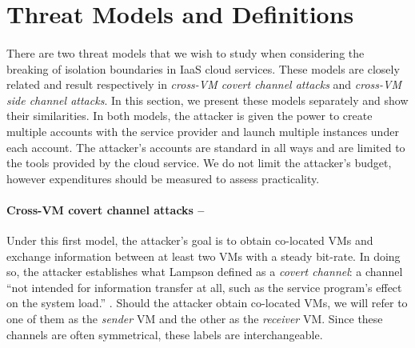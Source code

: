 \documentclass[orivec,envcountsame, a4paper, 11pt]{llncs}
\begin{document}
\section{Threat Models and Definitions}
\label{sec:threatmodel}

\begin{comment}
	- Threat model is realistic: Ristenpart 2009. Achieve random and targeted co-residence, establish communication channels
	- Show that model still held a few years later with Xu 2015 and Varadarajan 2015. Even though Amazon had changed their policy slightly
	- Lack of more recent study, could be "due" very soon
\end{comment}


\paragraph{} There are two threat models that we wish to study when considering the breaking of isolation boundaries in IaaS cloud services. These models are closely related and result respectively in \textit{cross-VM covert channel attacks} and \textit{cross-VM side channel attacks}. In this section, we present these models separately and show their similarities. In both models, the attacker is given the power to create multiple accounts with the service provider and launch multiple instances under each account. The attacker's accounts are standard in all ways and are limited to the tools provided by the cloud service. We do not limit the attacker's budget, however expenditures should be measured to assess practicality.

\paragraph{Cross-VM covert channel attacks --} Under this first model, the attacker's goal is to obtain co-located VMs and exchange information between at least two VMs with a steady bit-rate. In doing so, the attacker establishes what Lampson defined as a \textit{covert channel}: a channel ``not intended for information transfer at all, such as the service program's effect on the system load.'' \cite{Lampson1973}. Should the attacker obtain co-located VMs, we will refer to one of them as the \textit{sender} VM and the other as the \textit{receiver} VM. Since these channels are often symmetrical, these labels are interchangeable.
\end{document}

